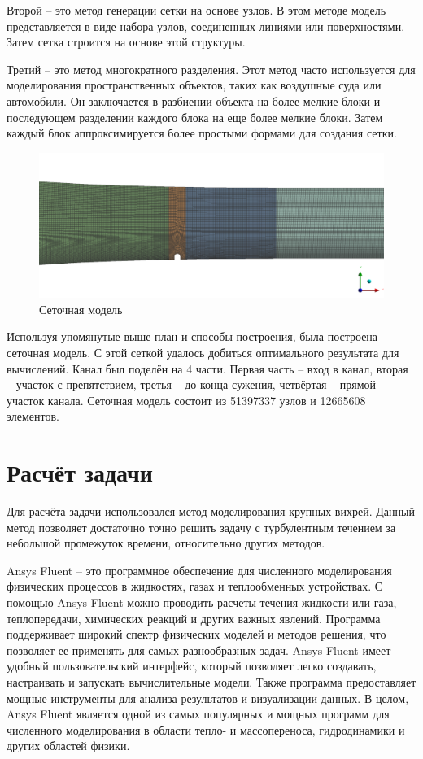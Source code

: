	Второй -- это метод генерации сетки на основе узлов. В этом методе модель представляется в виде набора узлов, соединенных линиями или поверхностями. Затем сетка строится на основе этой структуры.
	
	Третий -- это метод многократного разделения. Этот метод часто используется для моделирования пространственных объектов, таких как воздушные суда или автомобили. Он заключается в разбиении объекта на более мелкие блоки и последующем разделении каждого блока на еще более мелкие блоки. Затем каждый блок аппроксимируется более простыми формами для создания сетки.
	
	\begin{figure}[H]
		\centering
		\includegraphics[width=1\linewidth]{../Assets/Mesh1}
		\caption{Сеточная модель}
		\label{fig:mesh1}
	\end{figure}
	
	Используя упомянутые выше план и способы построения, была построена сеточная модель. С этой сеткой удалось добиться оптимального результата для вычислений. Канал был поделён на 4 части. Первая часть -- вход в канал, вторая -- участок с препятствием, третья -- до конца сужения, четвёртая -- прямой участок канала. Сеточная модель состоит из 51397337 узлов и 12665608 элементов.
	
\section{Расчёт задачи}

	Для расчёта задачи использовался метод моделирования крупных вихрей. Данный метод позволяет достаточно точно решить задачу с турбулентным течением за небольшой промежуток времени, относительно других методов.
	
	Ansys Fluent -- это программное обеспечение для численного моделирования физических процессов в жидкостях, газах и теплообменных устройствах. С помощью Ansys Fluent можно проводить расчеты течения жидкости или газа, теплопередачи, химических реакций и других важных явлений. Программа поддерживает широкий спектр физических моделей и методов решения, что позволяет ее применять для самых разнообразных задач. Ansys Fluent имеет удобный пользовательский интерфейс, который позволяет легко создавать, настраивать и запускать вычислительные модели. Также программа предоставляет мощные инструменты для анализа результатов и визуализации данных. В целом, Ansys Fluent является одной из самых популярных и мощных программ для численного моделирования в области тепло- и массопереноса, гидродинамики и других областей физики.
	
